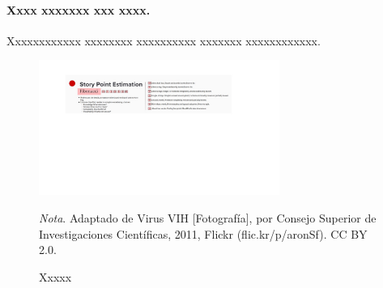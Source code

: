 \paragraph{Xxxx xxxxxxx xxx xxxx.} Xxxxxxxxxxxx xxxxxxxx xxxxxxxxxx xxxxxxx xxxxxxxxxxxx.

\begin{figure}[H]
\centering
\includegraphics[width=0.7\textwidth]{figures/example.jpg}
\caption{Xxxxx}
\label{fig:figura1}
\textit{Nota}. Adaptado de Virus VIH [Fotografía], por Consejo Superior de Investigaciones Científicas, 2011, Flickr (flic.kr/p/aronSf). CC BY 2.0.
\end{figure}